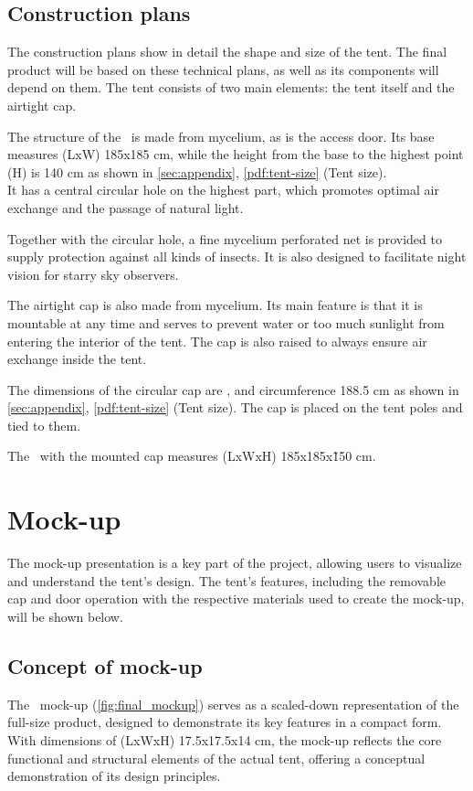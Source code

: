 \documentclass{article}
\begin{document}
\subsection{Construction plans}
The construction plans show in detail the shape and size of the tent. The final product
will be based on these technical plans, as well as its components will depend on them.
The tent consists of two main elements: the tent itself and the airtight cap.

The structure of the \myc\ is made from mycelium, as is the access door.
Its base measures (LxW) 185x185 cm, while the height from the base to the highest point (H)
is 140 cm as shown in \autoref{sec:appendix}, \autoref{pdf:tent-size} (Tent size).\\
It has a central circular hole on the highest part, which promotes optimal air exchange
and the passage of natural light.

Together with the circular hole, a fine mycelium perforated net is provided to supply
protection against all kinds of insects. It is also designed to facilitate night vision for starry
sky observers.

The airtight cap is also made from mycelium. Its main feature is that it is mountable at
any time and serves to prevent water or too much sunlight from entering the interior of
the tent. The cap is also raised to always ensure air exchange inside the tent.

The dimensions of the circular cap are \diameter 60cm, and circumference 188.5 cm
as shown in \autoref{sec:appendix}, \autoref{pdf:tent-size} (Tent size).
The cap is placed on the tent poles and tied to them.

The \myc\ with the mounted cap measures (LxWxH) 185x185x\~150 cm.

\section{Mock-up}
The mock-up presentation is a key part of the project, allowing users to visualize and
understand the tent's design. The tent's features, including the removable cap and door
operation with the respective materials used to create the mock-up, will be shown below.

\subsection{Concept of mock-up}
The \myc\ mock-up (\autoref{fig:final_mockup}) serves as a scaled-down representation of
the full-size product, designed to demonstrate its key features in a compact form. With
dimensions of (LxWxH) 17.5x17.5x14 cm, the mock-up reflects the core functional and
structural elements of the actual tent, offering a conceptual demonstration of its design
principles.
\end{document}
